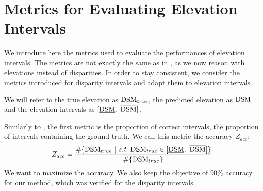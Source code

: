 \section{Metrics for Evaluating Elevation Intervals}\label{sec:metrics_elevation}
We introduce here the metrics used to evaluate the performances of elevation intervals. The metrics are not exactly the same as in , as we now reason with elevations instead of disparities. In order to stay consistent, we consider the metrics introduced for disparity intervals and adapt them to elevation intervals. 

We will refer to the true elevation as $\mathrm{DSM}_{true}$, the predicted elevation as $\mathrm{DSM}$ and the elevation intervals as $[\underline{\mathrm{DSM}},~\overline{\mathrm{DSM}}]$.

Similarly to , the first metric is the proportion of correct intervals, \ie the proportion of intervals containing the ground truth. We call this metric the accuracy $Z_{acc}$:
\begin{align}\label{eq:relative_accuracy_elevation}
    Z_{acc} = \dfrac{\#\{\DSM_{true} ~|~ \st ~\DSM_{true}\in [\underline{\DSM},~\overline{\DSM}]\}}{\#\{\DSM_{true}\}}
\end{align}
We want to maximize the accuracy. We also keep the objective of $90\%$ accuracy for our method, which was verified for the disparity intervals.

